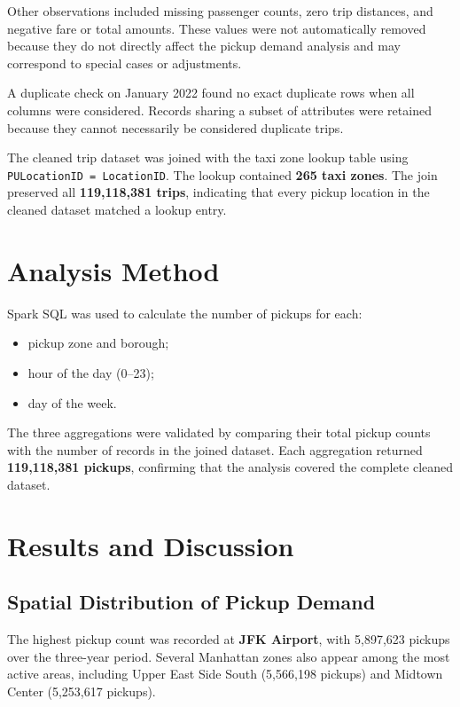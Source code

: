 \documentclass[10pt,a4paper]{article}
\begin{document}
Other observations included missing passenger counts, zero trip
distances, and negative fare or total amounts. These values were not
automatically removed because they do not directly affect the pickup
demand analysis and may correspond to special cases or adjustments.

A duplicate check on January 2022 found no exact duplicate rows when
all columns were considered. Records sharing a subset of attributes
were retained because they cannot necessarily be considered duplicate
trips.

The cleaned trip dataset was joined with the taxi zone lookup table
using \texttt{PULocationID = LocationID}. The lookup contained
\textbf{265 taxi zones}. The join preserved all
\textbf{119,118,381 trips}, indicating that every pickup location
in the cleaned dataset matched a lookup entry.

\section{Analysis Method}

Spark SQL was used to calculate the number of pickups for each:

\begin{itemize}
    \item pickup zone and borough;
    \item hour of the day (0--23);
    \item day of the week.
\end{itemize}

The three aggregations were validated by comparing their total pickup
counts with the number of records in the joined dataset. Each aggregation
returned \textbf{119,118,381 pickups}, confirming that the analysis
covered the complete cleaned dataset.

\newpage

\section{Results and Discussion}

\subsection{Spatial Distribution of Pickup Demand}

The highest pickup count was recorded at \textbf{JFK Airport},
with 5,897,623 pickups over the three-year period. Several Manhattan
zones also appear among the most active areas, including Upper East
Side South (5,566,198 pickups) and Midtown Center (5,253,617 pickups).
\end{document}
